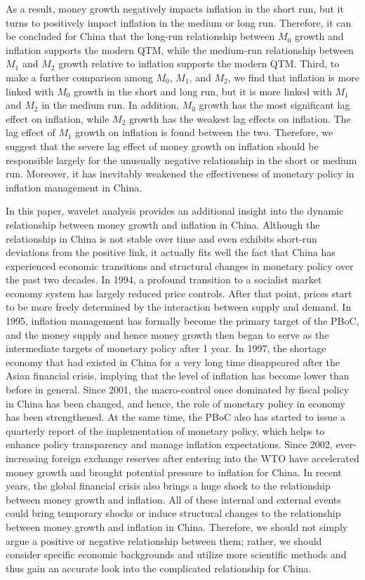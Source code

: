 \documentclass[a4paper,fleqn]{cas-sc}
\begin{document}
As a result, money growth negatively impacts inflation in the short run, but it turns to positively impact inflation in the medium or long run. Therefore, it can be concluded for China that the long-run relationship between $M_0$ growth and inflation supports the modern QTM, while the medium-run relationship between $M_1$ and $M_2$ growth relative to inflation supports the modern QTM. Third, to make a further comparison among $M_0$, $M_1$, and $M_2$, we find that inflation is more linked with $M_0$ growth in the short and long run, but it is more linked with $M_1$ and $M_2$ in the medium run. In addition, $M_0$ growth has the most significant lag effect on inflation, while $M_2$ growth has the weakest lag effects on inflation. The lag effect of $M_1$ growth on inflation is found between the two. Therefore, we suggest that the severe lag effect of money growth on inflation should be responsible largely for the unusually negative relationship in the short or medium run. Moreover, it has inevitably weakened the effectiveness of monetary policy in inflation management in China.

In this paper, wavelet analysis provides an additional insight into the dynamic relationship between money growth and inflation in China. Although the relationship in China is not stable over time and even exhibits short-run deviations from the positive link, it actually fits well the fact that China has experienced economic transitions and structural changes in monetary policy over the past two decades. In 1994, a profound transition to a socialist market economy system has largely reduced price controls. After that point, prices start to be more freely determined by the interaction between supply and demand. In 1995, inflation management has formally become the primary target of the PBoC, and the money supply and hence money growth then began to serve as the intermediate targets of monetary policy after 1 year. In 1997, the shortage economy that had existed in China for a very long time disappeared after the Asian financial crisis, implying that the level of inflation has become lower than before in general. Since 2001, the macro-control once dominated by fiscal policy in China has been changed, and hence, the role of monetary policy in economy has been strengthened. At the same time, the PBoC also has started to issue a quarterly report of the implementation of monetary policy, which helps to enhance policy transparency and manage inflation expectations. Since 2002, ever-increasing foreign exchange reserves after entering into the WTO have accelerated money growth and brought potential pressure to inflation for China. In recent years, the global financial crisis also brings a huge shock to the relationship between money growth and inflation. All of these internal and external events could bring temporary shocks or induce structural changes to the relationship between money growth and inflation in China. Therefore, we should not simply argue a positive or negative relationship between them; rather, we should consider specific economic backgrounds and utilize more scientific methods and thus gain an accurate look into the complicated relationship for China.
\end{document}
